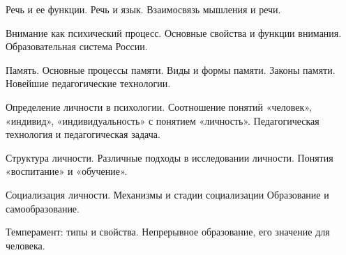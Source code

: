 \documentclass[
	14pt,
	a4paper,
	]
	{scrartcl}
\begin{document}
\vfill

\newpage


\shapk
{}
\setcounter{zad}{0}

\vfill
\z 	Речь и ее функции. Речь и язык. Взаимосвязь мышления и речи.
 \vfill
\z  
 \vfill

\vfill

\newpage


\shapk
{}
\setcounter{zad}{0}

\vfill
\z 	Внимание как психический процесс. Основные свойства и функции внимания.
 \vfill
\z 	Образовательная система России.
 \vfill

\vfill

\newpage


\shapk
{}
\setcounter{zad}{0}

\vfill
\z 	Память. Основные процессы памяти. Виды и формы памяти. Законы памяти.
 \vfill
\z 	Новейшие педагогические технологии.
 \vfill

\vfill

\newpage


\shapk
{}
\setcounter{zad}{0}

\vfill
\z 	Определение личности в психологии. Соотношение понятий «человек», «индивид», «индивидуальность» с понятием «личность».
 \vfill
\z 	Педагогическая технология и педагогическая задача.
 \vfill

\vfill

\newpage


\shapk
{}
\setcounter{zad}{0}

\vfill
\z 	Структура личности. Различные подходы в исследовании личности.
 \vfill
\z 	Понятия «воспитание» и «обучение».
 \vfill

\vfill

\newpage


\shapk
{}
\setcounter{zad}{0}

\vfill
\z 	Социализация личности. Механизмы и стадии социализации
 \vfill
\z 	Образование и самообразование.
 \vfill

\vfill

\newpage


\shapk
{}
\setcounter{zad}{0}

\vfill
\z 	Темперамент: типы и свойства.
 \vfill
\z 	Непрерывное образование, его значение для человека.
 \vfill

\vfill
\end{document}
